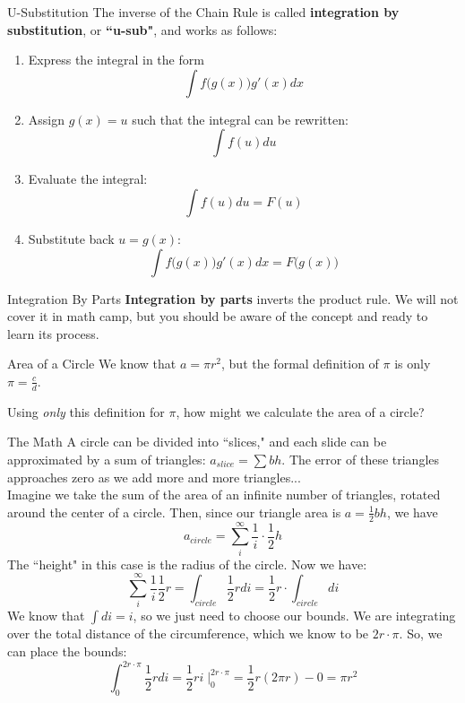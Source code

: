 \documentclass[10pt]{beamer}
\begin{document}
\begin{frame}{U-Substitution}
    The inverse of the Chain Rule is called \textbf{integration by substitution}, or \textbf{``u-sub"}, and works as follows:

    \begin{enumerate}
        \item Express the integral in the form
        \[\int f\Big(g(x)\Big) g'(x) dx\]
        \item Assign $g(x) = u$ such that the integral can be rewritten:
        \[ \int f(u) du\]
        \item Evaluate the integral:
        \[\int f(u) du = F(u)\]
        \item Substitute back $u = g(x)$:
        \[\int f\Big(g(x)\Big) g'(x) dx = F\Big(g(x)\Big)\]
    \end{enumerate}
\end{frame}

\begin{frame}{Integration By Parts}
    \textbf{Integration by parts} inverts the product rule. We will not cover it in math camp, but you should be aware of the concept and ready to learn its process.
\end{frame}

\begin{frame}{Area of a Circle}
    We know that $a = \pi r^2$, but the formal definition of $\pi$ is only $\pi = \frac{c}{d}$. \\

    \vspace{.5cm}

    Using \textit{only} this definition for $\pi$, how might we calculate the area of a circle?
\end{frame}

\begin{frame}{The Math}
    A circle can be divided into ``slices," and each slide can be approximated by a sum of triangles: $a_{slice} = \sum bh$. The error of these triangles approaches zero as we add more and more triangles... \\
    Imagine we take the sum of the area of an infinite number of triangles, rotated around the center of a circle. Then, since our triangle area is $a = \frac{1}{2}bh$, we have
    \[a_{circle} = \sum_i^\infty \frac{1}{i} \cdot \frac{1}{2}h\]
    The ``height" in this case is the radius of the circle. Now we have:
    \[\sum_i^\infty \frac{1}{i}\frac{1}{2} r = \int_{circle}\frac{1}{2}rdi = \frac{1}{2}r \cdot \int_{circle} di\]
    We know that $\int di = i$, so we just need to choose our bounds. We are integrating over the total distance of the circumference, which we know to be $2r \cdot \pi$. So, we can place the bounds:
    \[\int_0^{2r \cdot \pi}\frac{1}{2}rdi = \frac{1}{2}ri \; \bigg|_0^{2r \cdot \pi} = \frac{1}{2}r (2\pi r) - 0 = \pi r^2\]
\end{frame}
\end{document}
